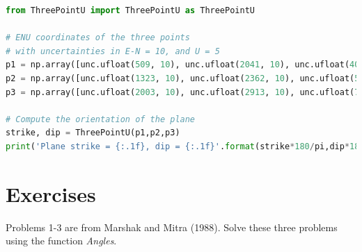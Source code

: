 \documentclass[a4paper , 12pt]{book}
\begin{document}
\begin{center}
\begin{lstlisting}[language=Python, frame=single]
from ThreePointU import ThreePointU as ThreePointU

# ENU coordinates of the three points
# with uncertainties in E-N = 10, and U = 5
p1 = np.array([unc.ufloat(509, 10), unc.ufloat(2041, 10), unc.ufloat(400, 5)])
p2 = np.array([unc.ufloat(1323, 10), unc.ufloat(2362, 10), unc.ufloat(500, 5)])
p3 = np.array([unc.ufloat(2003, 10), unc.ufloat(2913, 10), unc.ufloat(700, 5)])

# Compute the orientation of the plane
strike, dip = ThreePointU(p1,p2,p3)
print('Plane strike = {:.1f}, dip = {:.1f}'.format(strike*180/pi,dip*180/pi))
\end{lstlisting}
\end{center}

\section{Exercises}

Problems 1-3 are from Marshak and Mitra (1988). Solve these three problems using the function \textit{Angles}.
\end{document}
